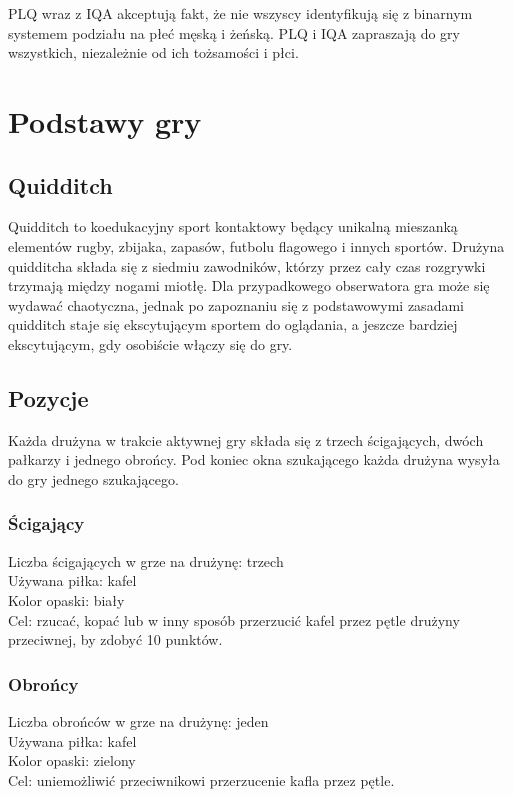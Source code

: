 \documentclass[12pt]{article}
\begin{document}
PLQ wraz z IQA akceptują fakt, że nie wszyscy identyfikują się z
binarnym systemem podziału na płeć męską i żeńską. PLQ i IQA zapraszają
do gry wszystkich, niezależnie od ich tożsamości i płci.

\pagebreak
\section{Podstawy gry}

\subsection{Quidditch}

Quidditch to koedukacyjny sport kontaktowy będący unikalną mieszanką
elementów rugby, zbijaka, zapasów, futbolu flagowego i innych sportów.
Drużyna quidditcha składa się z siedmiu zawodników, którzy przez cały
czas rozgrywki trzymają między nogami miotłę. Dla przypadkowego
obserwatora gra może się wydawać chaotyczna, jednak po zapoznaniu się z
podstawowymi zasadami quidditch staje się ekscytującym sportem do
oglądania, a jeszcze bardziej ekscytującym, gdy osobiście włączy się do
gry.

\subsection{Pozycje}
Każda drużyna w trakcie aktywnej gry składa się z trzech ścigających,
dwóch pałkarzy i jednego obrońcy. Pod koniec okna szukającego każda
drużyna wysyła do gry jednego szukającego.

\subsubsection{Ścigający}
Liczba ścigających w grze na drużynę: trzech \\
Używana piłka: kafel \\ 
Kolor opaski: biały \\
Cel: rzucać, kopać lub w inny sposób przerzucić kafel przez pętle
drużyny przeciwnej, by zdobyć 10 punktów.

\subsubsection{Obrońcy}
Liczba obrońców w grze na drużynę: jeden \\
Używana piłka: kafel \\
Kolor opaski: zielony \\
Cel: uniemożliwić przeciwnikowi przerzucenie kafla przez pętle.
\end{document}
